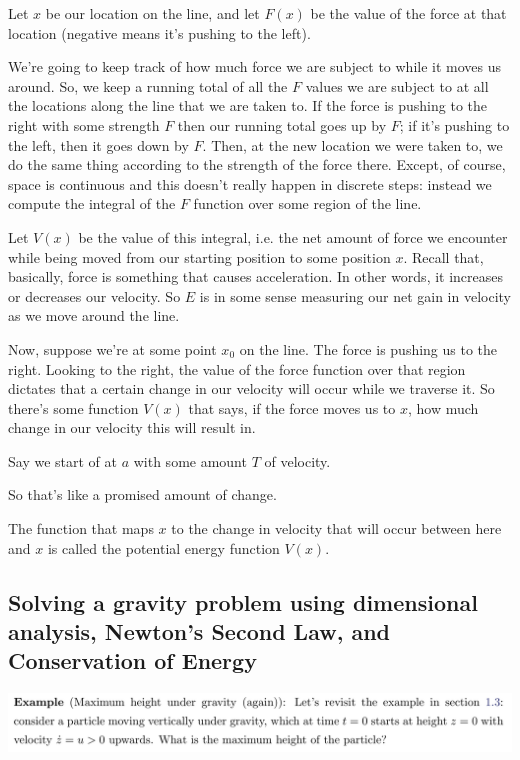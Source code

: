 Let $x$ be our location on the line, and let $F(x)$ be the value of the force at that location
(negative means it's pushing to the left).

We're going to keep track of how much force we are subject to while it moves us around. So, we keep
a running total of all the $F$ values we are subject to at all the locations along the line that we
are taken to. If the force is pushing to the right with some strength $F$ then our running total
goes up by $F$; if it's pushing to the left, then it goes down by $F$. Then, at the new location we
were taken to, we do the same thing according to the strength of the force there. Except, of course,
space is continuous and this doesn't really happen in discrete steps: instead we compute the
integral of the $F$ function over some region of the line.

Let $V(x)$ be the value of this integral, i.e. the net amount of force we encounter while being
moved from our starting position to some position $x$. Recall that, basically, force is something
that causes acceleration. In other words, it increases or decreases our velocity. So $E$ is in some
sense measuring our net gain in velocity as we move around the line.

Now, suppose we're at some point $x_0$ on the line. The force is pushing us to the right. Looking to
the right, the value of the force function over that region dictates that a certain change in our
velocity will occur while we traverse it. So there's some function $V(x)$ that says, if the force
moves us to $x$, how much change in our velocity this will result in.

Say we start of at $a$ with some amount $T$ of velocity.

So that's like a promised amount of
change.


The function that maps $x$ to the
change in velocity that will occur between here and $x$ is called the potential energy function
$V(x)$.

\subsection{Solving a gravity problem using dimensional analysis, Newton's Second Law, and Conservation of Energy}

\begin{mdframed}
  \includegraphics[width=400pt]{img/physics--classical-mechanics--oxford--dynamics--example--gravity.png}
\end{mdframed}

